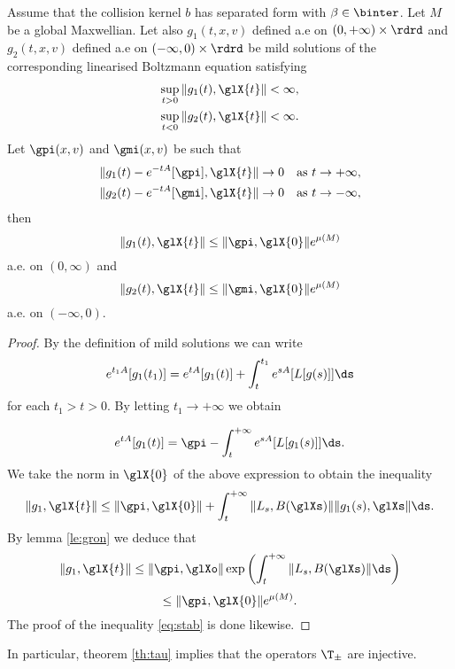 \begin{theorem}	\label{th:tau}
	Assume that the collision kernel $b$ has separated form with $\beta\in \binter$. Let $M$ be a global Maxwellian. Let also $g_1(t,x,v) $ defined a.e on $(0,+\infty)\times\rdrd$ and $g_2(t,x,v) $ defined a.e on $( -\infty,0)\times\rdrd$ be   mild solutions of the corresponding linearised Boltzmann equation  satisfying 
	\begin{align*}
		\sup_{t>0}\|g_1 (t),\glX{t}\|<\infty,\\
		\sup_{t<0}\|g_2 (t),\glX{t}\|<\infty. 
	\end{align*}
	Let $\gpi(x,v)$ and $\gmi(x,v)$ be such that
	\begin{align*}
		 \|g_1 (t)-e^{-tA}[\gpi],\glX{t}\|&\to 0 \quad\mbox {as }t\to+\infty,\\
		 \|g_2 (t)-e^{-tA}[\gmi],\glX{t}\|&\to 0 \quad\mbox {as }t\to-\infty,
	\end{align*}
	then
	 \begin{equation}
		\|g_1 (t) ,\glX{t}\|\le \|\gpi ,\glX{0}\|e^{ \mu(M)}
	\end{equation} 
	a.e. on $(0,\infty)$ and 
	 \begin{equation}\label{eq:stab}
	  	\|g_2 (t) ,\glX{t}\|\le \|\gmi ,\glX{0}\|e^{ \mu(M)}
	  \end{equation} a.e. on $(-\infty,0)$.
\end{theorem}
\begin{proof}
	By the definition of mild solutions we can write
	\[e^{t_1A} [g_1(t_1)]=e^{tA}[g_1(t)]+\int_{t}^{t_1}e^{sA}[L[g(s)]]\ds \] for each $t_1>t>0$. By letting $t_1\to +\infty$ we obtain

	\[e^{tA}[g_1 (t)]=\gpi-\int_{t}^{+\infty}e^{sA}[L[g_1(s)]]\ds.\] We take the norm in $\glX{0}$ of the above expression to obtain the inequality
	 \begin{equation*}
		\|g_1 ,\glX{t}\|\le \|\gpi,\glX{0}\|  + \int_t^{+\infty} \|L_s,B(\glXs)\|\|g_1(s),\glXs\|\ds.
	\end{equation*} 
%
	By lemma \ref{le:gron} we deduce that
	\[\|g_1 ,\glX{t}\|\le \|\gpi,\glXo\|\exp \left( \int_t^{+\infty} \|L_s,B(\glXs)\| \ds\right)\]\[\le\|\gpi,\glX{0}\| e^{ \mu(M)}. \]
The proof of the inequality \eqref{eq:stab} is done likewise.
\end{proof}
In particular,   theorem \ref{th:tau} implies that the operators $\T_\pm$ are injective.



